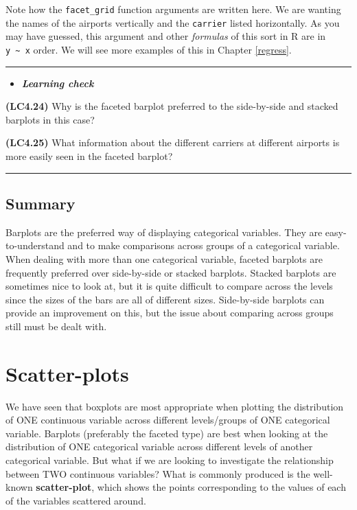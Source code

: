 \documentclass[]{tufte-book}
\let\oldrule=\rule
\renewcommand{\rule}[1]{\oldrule{\linewidth}}
\newenvironment{rmdblock}[1]
  {\begin{shaded*}
  \begin{itemize}
  \renewcommand{\labelitemi}{
    \raisebox{-.7\height}[0pt][0pt]{
    }
  }
  \item
  }
  {
  \end{itemize}
  \end{shaded*}
  }
\newenvironment{learncheck}
  {\begin{rmdblock}{warning}}
  {\end{rmdblock}}
\begin{document}
Note how the \texttt{facet\_grid} function arguments are written here.
We are wanting the names of the airports vertically and the
\texttt{carrier} listed horizontally. As you may have guessed, this
argument and other \emph{formulas} of this sort in R are in
\texttt{y\ \textasciitilde{}\ x} order. We will see more examples of
this in Chapter \ref{regress}.

\begin{center}\rule{0.5\linewidth}{\linethickness}\end{center}

\begin{learncheck}
\textbf{\emph{Learning check}}
\end{learncheck}

\textbf{(LC4.24)} Why is the faceted barplot preferred to the
side-by-side and stacked barplots in this case?

\textbf{(LC4.25)} What information about the different carriers at
different airports is more easily seen in the faceted barplot?

\begin{center}\rule{0.5\linewidth}{\linethickness}\end{center}

\subsection{Summary}\label{summary-2}

Barplots are the preferred way of displaying categorical variables. They
are easy-to-understand and to make comparisons across groups of a
categorical variable. When dealing with more than one categorical
variable, faceted barplots are frequently preferred over side-by-side or
stacked barplots. Stacked barplots are sometimes nice to look at, but it
is quite difficult to compare across the levels since the sizes of the
bars are all of different sizes. Side-by-side barplots can provide an
improvement on this, but the issue about comparing across groups still
must be dealt with.

\section{Scatter-plots}\label{scatter-plots}

We have seen that boxplots are most appropriate when plotting the
distribution of ONE continuous variable across different levels/groups
of ONE categorical variable. Barplots (preferably the faceted type) are
best when looking at the distribution of ONE categorical variable across
different levels of another categorical variable. But what if we are
looking to investigate the relationship between TWO continuous
variables? What is commonly produced is the well-known
\textbf{scatter-plot}, which shows the points corresponding to the
values of each of the variables scattered around.
\end{document}
